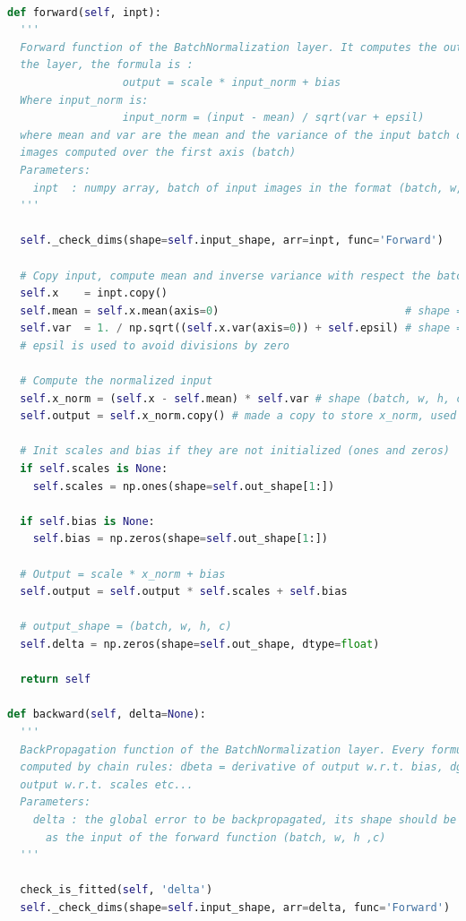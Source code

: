 \documentclass[12pt,a4paper]{report}
\begin{document}
\lstset{style=snippet}
\begin{lstlisting}[language=Python, caption=NumPyNet version of batchnorm function, label=code:py_batchnorm]

def forward(self, inpt):
  '''
  Forward function of the BatchNormalization layer. It computes the output of
  the layer, the formula is :
                  output = scale * input_norm + bias
  Where input_norm is:
                  input_norm = (input - mean) / sqrt(var + epsil)
  where mean and var are the mean and the variance of the input batch of
  images computed over the first axis (batch)
  Parameters:
    inpt  : numpy array, batch of input images in the format (batch, w, h, c)
  '''

  self._check_dims(shape=self.input_shape, arr=inpt, func='Forward')

  # Copy input, compute mean and inverse variance with respect the batch axis
  self.x    = inpt.copy()
  self.mean = self.x.mean(axis=0)                             # shape = (w, h, c)
  self.var  = 1. / np.sqrt((self.x.var(axis=0)) + self.epsil) # shape = (w, h, c)
  # epsil is used to avoid divisions by zero

  # Compute the normalized input
  self.x_norm = (self.x - self.mean) * self.var # shape (batch, w, h, c)
  self.output = self.x_norm.copy() # made a copy to store x_norm, used in Backward

  # Init scales and bias if they are not initialized (ones and zeros)
  if self.scales is None:
    self.scales = np.ones(shape=self.out_shape[1:])

  if self.bias is None:
    self.bias = np.zeros(shape=self.out_shape[1:])

  # Output = scale * x_norm + bias
  self.output = self.output * self.scales + self.bias

  # output_shape = (batch, w, h, c)
  self.delta = np.zeros(shape=self.out_shape, dtype=float)

  return self

def backward(self, delta=None):
  '''
  BackPropagation function of the BatchNormalization layer. Every formula is a derivative
  computed by chain rules: dbeta = derivative of output w.r.t. bias, dgamma = derivative of
  output w.r.t. scales etc...
  Parameters:
    delta : the global error to be backpropagated, its shape should be the same
      as the input of the forward function (batch, w, h ,c)
  '''

  check_is_fitted(self, 'delta')
  self._check_dims(shape=self.input_shape, arr=delta, func='Forward')


\end{lstlisting}
\end{document}
